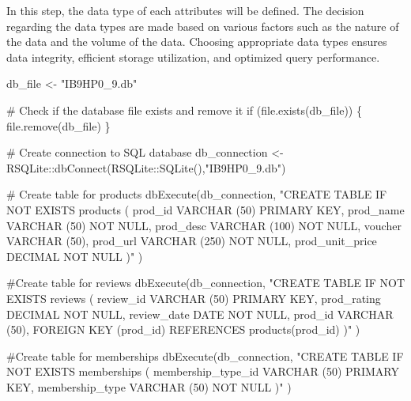 \documentclass[
  letterpaper,
  DIV=11,
  numbers=noendperiod]{scrartcl}
\newenvironment{Shaded}{\begin{snugshade}}{\end{snugshade}}
\newcommand{\CommentTok}[1]{\textcolor[rgb]{0.37,0.37,0.37}{#1}}
\newcommand{\ControlFlowTok}[1]{\textcolor[rgb]{0.00,0.23,0.31}{#1}}
\newcommand{\FunctionTok}[1]{\textcolor[rgb]{0.28,0.35,0.67}{#1}}
\newcommand{\NormalTok}[1]{\textcolor[rgb]{0.00,0.23,0.31}{#1}}
\newcommand{\OtherTok}[1]{\textcolor[rgb]{0.00,0.23,0.31}{#1}}
\newcommand{\SpecialCharTok}[1]{\textcolor[rgb]{0.37,0.37,0.37}{#1}}
\newcommand{\StringTok}[1]{\textcolor[rgb]{0.13,0.47,0.30}{#1}}
\begin{document}
In this step, the data type of each attributes will be defined. The
decision regarding the data types are made based on various factors such
as the nature of the data and the volume of the data. Choosing
appropriate data types ensures data integrity, efficient storage
utilization, and optimized query performance.

\begin{Shaded}
\begin{Highlighting}[numbers=left,,]
\NormalTok{db\_file }\OtherTok{\textless{}{-}} \StringTok{"IB9HP0\_9.db"}

\CommentTok{\# Check if the database file exists and remove it}
\ControlFlowTok{if}\NormalTok{ (}\FunctionTok{file.exists}\NormalTok{(db\_file)) \{}
  \FunctionTok{file.remove}\NormalTok{(db\_file)}
\NormalTok{\}}

\CommentTok{\# Create connection to SQL database}
\NormalTok{db\_connection }\OtherTok{\textless{}{-}}\NormalTok{ RSQLite}\SpecialCharTok{::}\FunctionTok{dbConnect}\NormalTok{(RSQLite}\SpecialCharTok{::}\FunctionTok{SQLite}\NormalTok{(),}\StringTok{"IB9HP0\_9.db"}\NormalTok{)}

\CommentTok{\# Create table for products}
\FunctionTok{dbExecute}\NormalTok{(db\_connection, }
          \StringTok{"CREATE TABLE IF NOT EXISTS products (}
\StringTok{              prod\_id VARCHAR (50) PRIMARY KEY,}
\StringTok{              prod\_name VARCHAR (50) NOT NULL,}
\StringTok{              prod\_desc VARCHAR (100) NOT NULL,}
\StringTok{              voucher VARCHAR (50),}
\StringTok{              prod\_url VARCHAR (250) NOT NULL,}
\StringTok{              prod\_unit\_price DECIMAL NOT NULL}
\StringTok{              )"}
\NormalTok{          )}

\CommentTok{\#Create table for reviews}
\FunctionTok{dbExecute}\NormalTok{(db\_connection, }
          \StringTok{"CREATE TABLE IF NOT EXISTS reviews (}
\StringTok{              review\_id VARCHAR (50) PRIMARY KEY,}
\StringTok{              prod\_rating DECIMAL NOT NULL,}
\StringTok{              review\_date DATE NOT NULL,}
\StringTok{              prod\_id VARCHAR (50),}
\StringTok{              FOREIGN KEY (prod\_id)}
\StringTok{              REFERENCES products(prod\_id)}
\StringTok{              )"}
\NormalTok{          )}

\CommentTok{\#Create table for memberships}
\FunctionTok{dbExecute}\NormalTok{(db\_connection, }
          \StringTok{"CREATE TABLE IF NOT EXISTS memberships (}
\StringTok{              membership\_type\_id VARCHAR (50) PRIMARY KEY,}
\StringTok{              membership\_type VARCHAR (50) NOT NULL}
\StringTok{              )"}
\NormalTok{          )}


\end{Highlighting}
\end{Shaded}
\end{document}
